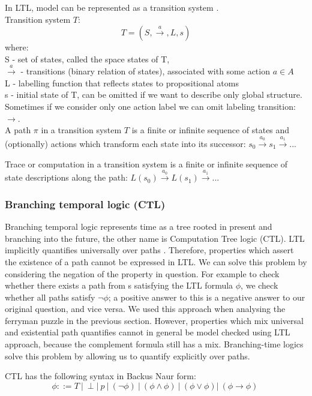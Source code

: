 In LTL, model can be represented as a transition system \cite{DGL1}.\\
Transition system $T$:
\[ T = (S,\stackrel{a}{\rightarrow}, L,s) \] 
where:\\
S - set of states, called the space states of T,\\
$\stackrel{a}{\rightarrow}$ - transitions (binary relation of states), associated with some action $a \in A$\\
L - labelling function that reflects states to propositional atoms\\
s - initial state of T, can be omitted if we want to describe only global structure.\\
Sometimes if we consider only one action label we can omit labeling transition: $\rightarrow$.\\
A path $\pi$ in a transition system $T$ is a finite or infinite sequence of states and (optionally) actions
which transform each state into its successor: $s_0 \stackrel{a_0}{\rightarrow} s_1 \stackrel{a_1}{\rightarrow} ... $

Trace or computation in a transition system is a finite or infinite sequence of state descriptions along the path:
$L(s_0) \stackrel{a_0}{\rightarrow} L(s_1) \stackrel{a_1}{\rightarrow} ... $

\subsubsection{Branching temporal logic (CTL)}
Branching temporal logic represents time as a tree rooted in present and 
branching into the future, the other name is Computation Tree logic (CTL).
LTL implicitly quantifies universally over paths \cite{DGL1}.  Therefore, properties which 
assert the existence of a path cannot be expressed in LTL. 
We can solve this problem by considering the negation of the property
in question. For example to check whether there exists a path from s satisfying the LTL formula $\phi$, we check whether all paths
satisfy $\neg\phi$; a positive answer to this is a negative answer to our original question, and vice versa.
We used this approach when analysing the ferryman puzzle in the previous section. 
However, properties which mix universal and existential path quantifies cannot in general be model
checked using LTL approach, because the complement formula still has a mix.
Branching-time logics solve this problem by allowing us to quantify explicitly over paths.

CTL has the following syntax in Backus Naur form:
\[ \phi ::= T\ |\  \perp |\  p\ |\  (\neg\phi)\  |\  (\phi \land \phi)\  |\  
(\phi \lor \phi) |\ (\phi \rightarrow \phi)\   \]

